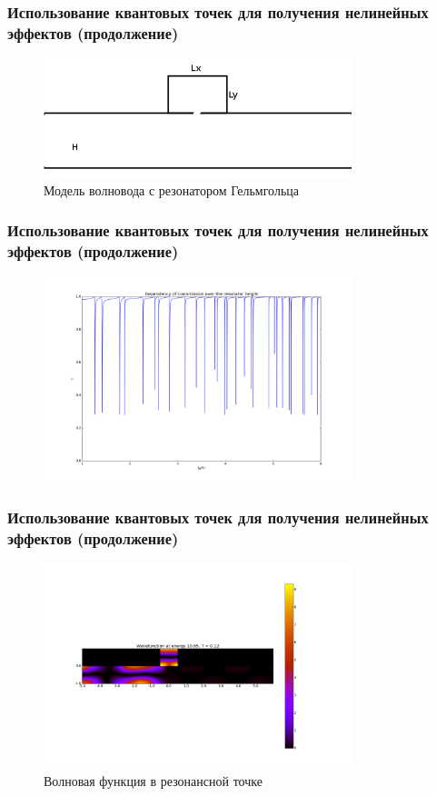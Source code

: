 \documentclass{beamer}
\begin{document}
\begin{frame}[fragile]
\frametitle{Использование квантовых точек для получения нелинейных эффектов (продолжение)}
\begin{figure}
\includegraphics[width=0.8\textwidth]{resonator.png}
\caption{Модель волновода с резонатором Гельмгольца}
\end{figure}
\end{frame}

\begin{frame}[fragile]
\frametitle{Использование квантовых точек для получения нелинейных эффектов (продолжение)}
\begin{figure}
\includegraphics[width=0.8\textwidth]{transmission-dependency-resonator.png}
\caption{}
\end{figure}
\end{frame}

\begin{frame}[fragile]
\frametitle{Использование квантовых точек для получения нелинейных эффектов (продолжение)}
\begin{figure}
\includegraphics[width=0.8\textwidth]{low-transmission.png}
\caption{Волновая функция в резонансной точке}
\end{figure}
\end{frame}
\end{document}
